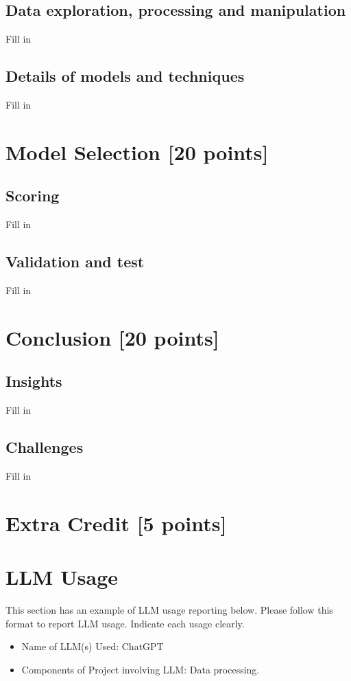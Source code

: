 \subsection{Data exploration, processing and manipulation}
Fill in

\subsection{Details of models and techniques}
Fill in

\newpage

\section{Model Selection [20 points]}
\subsection{Scoring}
Fill in

\subsection{Validation and test}
Fill in

\newpage

\section{Conclusion [20 points]}
\subsection{Insights}
Fill in

\subsection{Challenges}
Fill in
\newpage

\section{Extra Credit [5 points]}

\newpage

\section{LLM Usage}
This section has an example of LLM usage reporting below. Please follow this format to report LLM usage. Indicate each usage clearly.
\begin{itemize}
    \item Name of LLM(s) Used: ChatGPT
    \item Components of Project involving LLM: Data processing.
\end{itemize}


